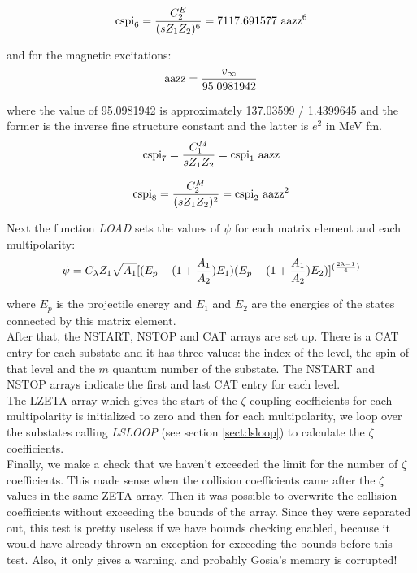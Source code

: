\begin{equation}
\mathrm{cspi}_6 = {C_2^E \over (s Z_1 Z_2)^6} = 7117.691577 ~\mathrm{aazz}^6
\end{equation}

\noindent and for the magnetic excitations:\\

\begin{equation}
\mathrm{aazz} = {v_\infty \over 95.0981942}
\end{equation}

\noindent where the value of 95.0981942 is approximately 137.03599 /
1.4399645 and the former is the inverse fine structure constant and the
latter is $e^2$ in MeV fm.\\

\begin{equation}
\mathrm{cspi}_7 = {C_1^M \over s Z_1 Z_2} = \mathrm{cspi}_1 ~\mathrm{aazz}
\end{equation}

\begin{equation}
\mathrm{cspi}_8 = {C_2^M \over (s Z_1 Z_2)^2} = \mathrm{cspi}_2 ~\mathrm{aazz}^2
\end{equation}

\noindent Next the function {\em LOAD} sets the values of $\psi$ for each
matrix element and each multipolarity:\\

\begin{equation}
\psi = C_\lambda Z_1 \sqrt{A_1} \large[(E_p - (1 + {A_1 \over A_2}) E_1)
(E_p - (1 + {A_1 \over A_2}) E_2)\large]^{({2 \lambda - 1 \over 4})}
\end{equation}

\noindent where $E_p$ is the projectile energy and $E_1$ and $E_2$ are the
energies of the states connected by this matrix element.\\

\noindent After that, the NSTART, NSTOP and CAT arrays are set up. There is
a CAT entry for each substate and it has three values: the index of the
level, the spin of that level and the $m$ quantum number of the substate.
The NSTART and NSTOP arrays indicate the first and last CAT entry for each
level.\\

\noindent The LZETA array which gives the start of the $\zeta$ coupling
coefficients for each multipolarity is initialized to zero and then for each
multipolarity, we loop over the substates calling {\em LSLOOP} (see section
\ref{sect:lsloop}) to calculate the $\zeta$ coefficients.\\

\noindent Finally, we make a check that we haven't exceeded the limit for
the number of $\zeta$ coefficients. This made sense when the collision
coefficients came after the $\zeta$ values in the same ZETA array. Then it
was possible to overwrite the collision coefficients without exceeding the
bounds of the array. Since they were separated out, this test is pretty
useless if we have bounds checking enabled, because it would have already
thrown an exception for exceeding the bounds before this test. Also, it only
gives a warning, and probably Gosia's memory is corrupted!\\
